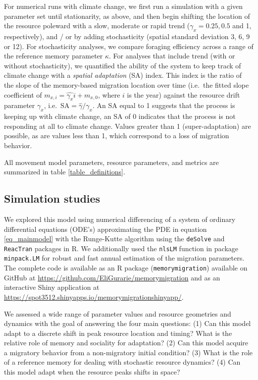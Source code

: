 \documentclass[utf8]{frontiersSCNS} %
\begin{document}
	For numerical runs with climate change, we first run a simulation with a given parameter set until stationarity, as above, and then begin shifting the location of the resource poleward with a slow, moderate or rapid trend ($\gamma_x = 0.25, 0.5$ and 1, respectively), and / or by adding stochasticity (spatial standard deviation 3, 6, 9 or 12). For stochasticity analyses, we compare foraging efficiency across a range of the reference memory parameter $\kappa$.  For analyses that include trend (with or without stochasticity), we quantified the ability of the system to keep track of climate change with a \emph{spatial adaptation} (SA) index. This index is the ratio of the slope of the memory-based migration location over time (i.e.~the fitted slope coefficient of $m_{x,i} = \widehat{\gamma_x} i + m_{x,0}$, where $i$ is the year) against the resource drift parameter $\gamma_x$, i.e.~$\text{SA} = \widehat{\gamma}/\gamma_x$. An SA equal to 1 suggests that the process is keeping up with climate change, an SA of 0 indicates that the process is not responding at all to climate change.  Values greater than 1 (super-adaptation) are possible, as are values less than 1, which correspond to a loss of migration behavior.
	
	All movement model parameters, resource parameters, and metrics are summarized in table \ref{table_definitions}. 
	
	\subsection{Simulation studies}
	
	We explored this model using numerical differencing of a system of ordinary differential equations (ODE's) approximating the PDE in equation \ref{eq_mainmodel} with the Runge-Kutte algorithm using the \texttt{deSolve} \citep{Soetaert2010} and \texttt{ReacTran} \citep{Soetaert2012} packages in R. We additionally used the \texttt{nlsLM} function in package \texttt{minpack.LM} \citep{minpack.lm} for robust and fast annual estimation of the migration parameters. The complete code is available as an R package (\texttt{memorymigration}) available on GitHub at \url{https://github.com/EliGurarie/memorymigration} and as an interactive Shiny application at \url{https://spot3512.shinyapps.io/memorymigrationshinyapp/}.
	
	We assessed a wide range of parameter values and resource geometries and dynamics with the goal of answering the four main questions: (1) Can this model adapt to a discrete shift in peak resource location and timing?  What is the relative role of memory and sociality for adaptation? (2) Can this model acquire a migratory behavior from a non-migratory initial condition? (3) What is the role of a reference memory for dealing with stochastic resource dynamics? (4) Can this model adapt when the resource peaks shifts in space?
	
\end{document}
